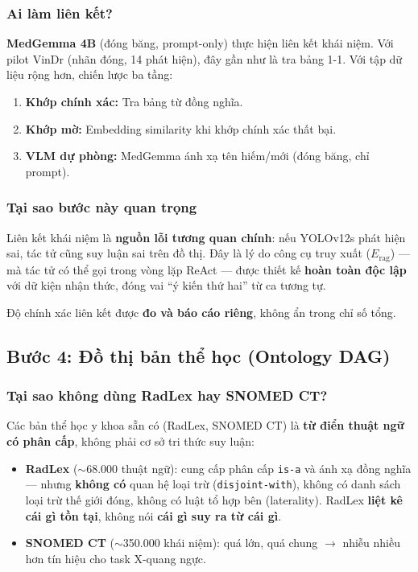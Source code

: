 \documentclass[11pt,a4paper]{article}
\begin{document}
\subsubsection{Ai làm liên kết?}
\textbf{MedGemma 4B} (đóng băng, prompt-only) thực hiện liên kết khái niệm. Với pilot VinDr (nhãn đóng, 14 phát hiện), đây gần như là tra bảng 1-1. Với tập dữ liệu rộng hơn, chiến lược ba tầng:
\begin{enumerate}[leftmargin=1.5em]
  \item \textbf{Khớp chính xác:} Tra bảng từ đồng nghĩa.
  \item \textbf{Khớp mờ:} Embedding similarity khi khớp chính xác thất bại.
  \item \textbf{VLM dự phòng:} MedGemma ánh xạ tên hiếm/mới (đóng băng, chỉ prompt).
\end{enumerate}

\subsubsection{Tại sao bước này quan trọng}
Liên kết khái niệm là \textbf{nguồn lỗi tương quan chính}: nếu YOLOv12s phát hiện sai, tác tử cũng suy luận sai trên đồ thị. Đây là lý do công cụ truy xuất ($E_\text{rag}$) --- mà tác tử có thể gọi trong vòng lặp ReAct --- được thiết kế \textbf{hoàn toàn độc lập} với dữ kiện nhận thức, đóng vai ``ý kiến thứ hai'' từ ca tương tự.

Độ chính xác liên kết được \textbf{đo và báo cáo riêng}, không ẩn trong chỉ số tổng.


\subsection{Bước 4: Đồ thị bản thể học (Ontology DAG)}

\subsubsection{Tại sao không dùng RadLex hay SNOMED CT?}

Các bản thể học y khoa sẵn có (RadLex, SNOMED CT) là \textbf{từ điển thuật ngữ có phân cấp}, không phải cơ sở tri thức suy luận:

\begin{itemize}[leftmargin=1.5em]
  \item \textbf{RadLex} ($\sim$68.000 thuật ngữ): cung cấp phân cấp \texttt{is-a} và ánh xạ đồng nghĩa --- nhưng \textbf{không có} quan hệ loại trừ (\texttt{disjoint-with}), không có danh sách loại trừ thế giới đóng, không có luật tổ hợp bên (laterality). RadLex \textbf{liệt kê cái gì tồn tại}, không nói \textbf{cái gì suy ra từ cái gì}.
  \item \textbf{SNOMED CT} ($\sim$350.000 khái niệm): quá lớn, quá chung $\to$ nhiễu nhiều hơn tín hiệu cho task X-quang ngực.
\end{itemize}
\end{document}

